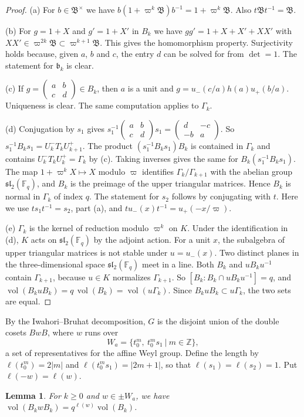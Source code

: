 \documentclass[12pt,letterpaper]{amsart}
\numberwithin{equation}{section}
\newtheorem{lemma}[theorem]{Lemma}
\theoremstyle{definition}
\theoremstyle{remark}
\DeclareMathOperator{\vol}{vol}
\newcommand{\fB}{\mathfrak{B}}
\newcommand{\fb}{\mathfrak{b}}
\newcommand{\Z}{\mathbb{Z}}
\newcommand{\Fq}{\mathbb{F}_q}
\newcommand{\mat}[4]{\begin{pmatrix} #1 & #2\\ #3 & #4\end{pmatrix}}
\begin{document}
\begin{proof}
(a) For $b\in\fB^\times$ we have $b(1+\varpi^k\fB)b^{-1}=1+\varpi^k\fB$.
Also $t\fB t^{-1}=\fB$.

(b) For $g=1+X$ and $g'=1+X'$ in $B_k$ we have $gg'=1+X+X'+XX'$ with
$XX'\in\varpi^{2k}\fB\subset\varpi^{k+1}\fB$. This gives the
homomorphism property. Surjectivity holds because, given $a$, $b$ and
$c$, the entry $d$ can be solved for from $\det=1$. The statement for
$\fb_k$ is clear.

(c) If $g=\mat{a}{b}{c}{d}\in B_k$, then $a$ is a unit and
$g=u_-(c/a)h(a)u_+(b/a)$. Uniqueness is clear. The same computation
applies to $\Gamma_k$.

(d) Conjugation by $s_1$ gives
$s_1^{-1}\mat abcd s_1=\mat d{-c}{-b}a$. So
$s_1^{-1}B_ks_1=U^-_kT_kU^+_{k+1}$. The product $(s_1^{-1}B_ks_1)B_k$
is contained in $\Gamma_k$ and contains $U^-_kT_kU^+_k=\Gamma_k$ by
(c). Taking inverses gives the same for $B_k(s_1^{-1}B_ks_1)$. The map
$1+\varpi^kX\mapsto X$ modulo $\varpi$ identifies
$\Gamma_k/\Gamma_{k+1}$ with the abelian group $\mathfrak{sl}_2(\Fq)$,
and $B_k$ is the preimage of the upper triangular matrices. Hence
$B_k$ is normal in $\Gamma_k$ of index $q$. The statement for $s_2$
follows by conjugating with $t$. Here we use $ts_1t^{-1}=s_2$, part
(a), and $tu_-(x)t^{-1}=u_+(-x/\varpi)$.

(e) $\Gamma_k$ is the kernel of reduction modulo $\varpi^k$ on $K$.
Under the identification in (d), $K$ acts on $\mathfrak{sl}_2(\Fq)$ by
the adjoint action. For a unit $x$, the subalgebra of upper triangular
matrices is not stable under $u=u_-(x)$. Two distinct planes in the
three-dimensional space $\mathfrak{sl}_2(\Fq)$ meet in a line. Both
$B_k$ and $uB_ku^{-1}$ contain $\Gamma_{k+1}$, because $u\in K$
normalizes $\Gamma_{k+1}$. So $[B_k:B_k\cap uB_ku^{-1}]=q$, and
$\vol(B_kuB_k)=q\,\vol(B_k)=\vol(u\Gamma_k)$. Since
$B_kuB_k\subset u\Gamma_k$, the two sets are equal.
\end{proof}

By the Iwahori--Bruhat decomposition, $G$ is the disjoint union of the
double cosets $BwB$, where $w$ runs over
\[
W_a=\{t_0^m,\ t_0^ms_1\ |\ m\in\Z\},
\]
a set of representatives for the affine Weyl group. Define the length
by $\ell(t_0^m)=2|m|$ and $\ell(t_0^ms_1)=|2m+1|$, so that
$\ell(s_1)=\ell(s_2)=1$. Put $\ell(-w)=\ell(w)$.

\begin{lemma}
\label{lemma:length}
For $k\geq 0$ and $w\in \pm W_a$, we have
$\vol(B_kwB_k)=q^{\ell(w)}\vol(B_k)$.
\end{lemma}
\end{document}
